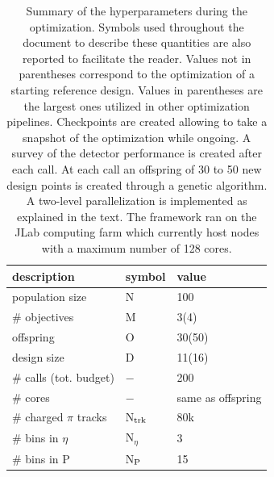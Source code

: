 \begin{table}[!]
    \centering
    \begin{tabular}{|M{3.cm} | M{3.5cm}| M{2.0cm}|}
        \hline
        \textbf{description} & \textbf{symbol} & \textbf{value} \\ 
        \hline
        \hline
        \small{population size} & N & 100 \\
        \small{\# objectives}   & M & 3(4)\\ 
        \small{offspring} & O & 30(50)\\
        \small{design size} & D & 11(16) \\
        \small{\# calls (tot. budget)} & $-$ & 200\\
        \small{\# cores} & $-$ & \small{same as offspring} \\
        \small{\# charged $\pi$ tracks} & N$_{\textup{trk}}$ & 80k\\
        \small{\# bins in $\eta$} & N$_{\eta}$ & 3 \\
        \small{\# bins in P} & N$_{\textup{P}}$ & 15 \\
        \hline
    \end{tabular}
    \caption{Summary of the hyperparameters during the optimization. Symbols used throughout the document to describe these quantities are also reported to facilitate the reader. Values not in parentheses correspond to the optimization of a starting reference design. Values in parentheses are the largest ones utilized in other optimization pipelines. Checkpoints are created allowing to take a snapshot of the optimization while ongoing. A survey of the detector performance is created after each call. At each call an offspring of 30 to 50 new design points is created through a genetic algorithm. A two-level parallelization is implemented as explained in the text. The framework ran on the JLab computing farm which currently host nodes with a maximum number of 128 cores.
    }
    \label{tab:complexity}
\end{table}




\clearpage